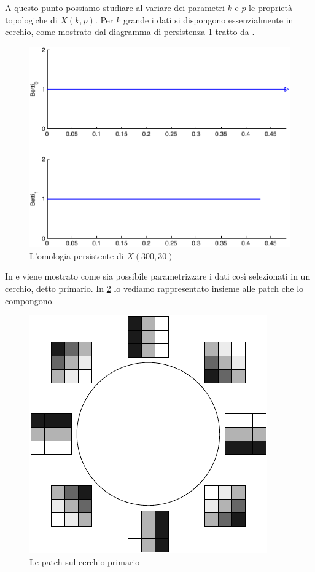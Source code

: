 A questo punto possiamo studiare al variare dei parametri $k$ e $p$ le proprietà topologiche di $X(k,p)$. Per $k$ grande i dati si dispongono essenzialmente in cerchio, come mostrato dal diagramma di persistenza \cref{fig:k300persistence} tratto da \cite{Carlsson2008}.

\begin{figure}[ht]
  \begin{center}
    \includegraphics[width=.8\linewidth]{gfx/image_patches_k300.pdf}
    \caption{L'omologia persistente di $X(300,30)$}
    \label{fig:k300persistence}
  \end{center}
\end{figure}

In \cite{Carlsson2008} e \cite{DeSilva2004} viene mostrato come sia possibile parametrizzare i dati così selezionati in un cerchio, detto primario. In \cref{fig:primarycircle} lo vediamo rappresentato insieme alle patch che lo compongono.

\begin{figure}[ht]
  \begin{center}
    \includegraphics[width=.4\linewidth]{gfx/primarycircle_labels.pdf}
    \caption{Le patch sul cerchio primario}
    \label{fig:primarycircle}
  \end{center}
\end{figure}

